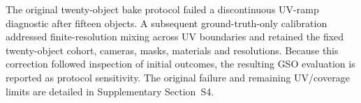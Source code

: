 \documentclass[times,twocolumn,final]{elsarticle}
\providecommand{\DIFadd}[1]{{\protect\color{blue} \sf #1}} %
\providecommand{\DIFaddbegin}{} %
\providecommand{\DIFaddend}{} %
\providecommand{\DIFdelbegin}{} %
\providecommand{\DIFdelend}{} %
\begin{document}
\DIFdelbegin %
\DIFdelend \DIFaddbegin \DIFadd{The original twenty-object bake protocol failed a discontinuous UV-ramp diagnostic after fifteen objects. A subsequent ground-truth-only calibration addressed finite-resolution mixing across UV boundaries and retained the fixed twenty-object cohort, cameras, masks, materials and resolutions. Because this correction followed inspection of initial outcomes, the resulting GSO evaluation is reported as protocol sensitivity. The original failure and remaining UV/coverage limits are detailed in Supplementary Section~S4.
}\DIFaddend 
\end{document}
